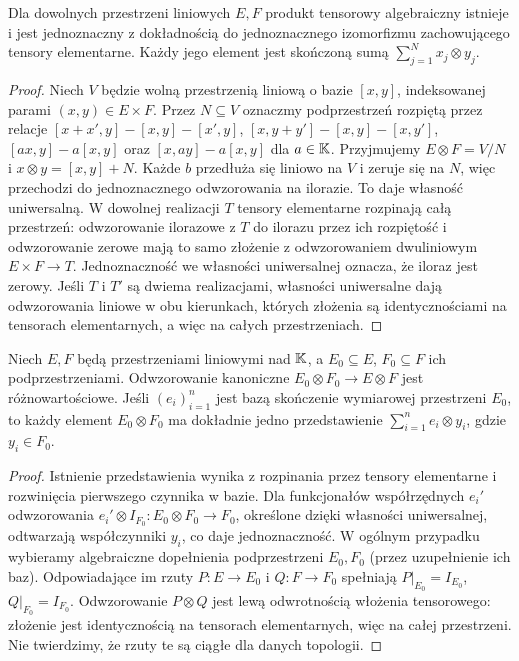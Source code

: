 \begin{stwierdzenie}
\label{prop:alg-existence24}
Dla dowolnych przestrzeni liniowych $E,F$ produkt tensorowy
algebraiczny istnieje i jest jednoznaczny z dokładnością do
jednoznacznego izomorfizmu zachowującego tensory elementarne.
Każdy jego element jest skończoną sumą $\sum_{j=1}^N x_j\otimes y_j$.
\end{stwierdzenie}
\begin{proof}
Niech $V$ będzie wolną przestrzenią liniową o bazie
$[x,y]$, indeksowanej parami $(x,y)\in E\times F$.
Przez $N\subseteq V$ oznaczmy podprzestrzeń rozpiętą przez
relacje $[x+x',y]-[x,y]-[x',y]$,
$[x,y+y']-[x,y]-[x,y']$, $[ax,y]-a[x,y]$
oraz $[x,ay]-a[x,y]$ dla $a\in\mathbb K$.
Przyjmujemy $E\otimes F=V/N$ i $x\otimes y=[x,y]+N$.
Każde $b$ przedłuża się liniowo na $V$ i zeruje się na $N$,
więc przechodzi do jednoznacznego odwzorowania na ilorazie.
To daje własność uniwersalną. W dowolnej realizacji $T$ tensory elementarne rozpinają
całą przestrzeń: odwzorowanie ilorazowe z $T$ do ilorazu
przez ich rozpiętość i odwzorowanie zerowe mają to samo
złożenie z odwzorowaniem dwuliniowym $E\times F\to T$.
Jednoznaczność we własności uniwersalnej oznacza,
że iloraz jest zerowy. Jeśli $T$ i $T'$ są dwiema
realizacjami, własności uniwersalne dają odwzorowania liniowe
w obu kierunkach, których złożenia są identycznościami na
tensorach elementarnych, a więc na całych przestrzeniach.
\end{proof}

\begin{lemat}
\label{lem:alg-inclusion24}
Niech $E,F$ będą przestrzeniami liniowymi nad $\mathbb K$,
a $E_0\subseteq E$, $F_0\subseteq F$ ich podprzestrzeniami.
Odwzorowanie kanoniczne $E_0\otimes F_0\to E\otimes F$
jest różnowartościowe. Jeśli $(e_i)_{i=1}^n$ jest bazą
skończenie wymiarowej przestrzeni $E_0$, to każdy element
$E_0\otimes F_0$ ma dokładnie jedno przedstawienie
$\sum_{i=1}^n e_i\otimes y_i$, gdzie $y_i\in F_0$.
\end{lemat}
\begin{proof}
Istnienie przedstawienia wynika z rozpinania przez tensory
elementarne i rozwinięcia pierwszego czynnika w bazie.
Dla funkcjonałów współrzędnych $e_i'$ odwzorowania
$e_i'\otimes I_{F_0}:E_0\otimes F_0\to F_0$,
określone dzięki własności uniwersalnej, odtwarzają
współczynniki $y_i$, co daje jednoznaczność.
W ogólnym przypadku wybieramy algebraiczne dopełnienia
podprzestrzeni $E_0,F_0$ (przez uzupełnienie ich baz).
Odpowiadające im rzuty $P:E\to E_0$ i $Q:F\to F_0$
spełniają $P|_{E_0}=I_{E_0}$, $Q|_{F_0}=I_{F_0}$.
Odwzorowanie $P\otimes Q$ jest lewą odwrotnością
włożenia tensorowego: złożenie jest identycznością na
tensorach elementarnych, więc na całej przestrzeni.
Nie twierdzimy, że rzuty te są ciągłe dla danych topologii.
\end{proof}

